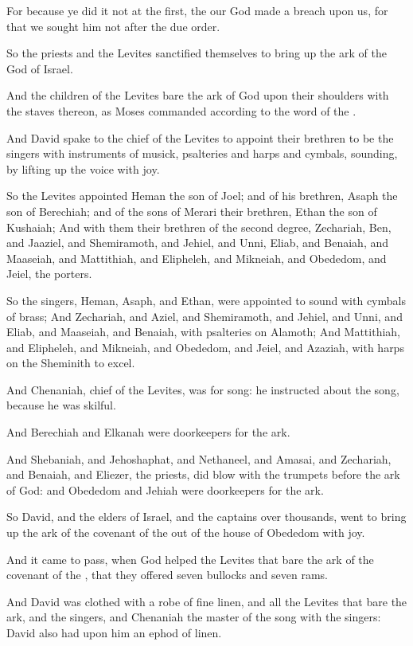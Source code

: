\Verse For because ye did it not at the first, the \LORD our God made a breach upon us, for that we sought him not after the due order.

\Verse So the priests and the Levites sanctified themselves to bring up the ark of the \LORD God of Israel.

\Verse And the children of the Levites bare the ark of God upon their shoulders with the staves thereon, as Moses commanded according to the word of the \LORD.

\Verse And David spake to the chief of the Levites to appoint their brethren to be the singers with instruments of musick, psalteries and harps and cymbals, sounding, by lifting up the voice with joy.

\Verse So the Levites appointed Heman the son of Joel; and of his brethren, Asaph the son of Berechiah; and of the sons of Merari their brethren, Ethan the son of Kushaiah; \Verse And with them their brethren of the second degree, Zechariah, Ben, and Jaaziel, and Shemiramoth, and Jehiel, and Unni, Eliab, and Benaiah, and Maaseiah, and Mattithiah, and Elipheleh, and Mikneiah, and Obededom, and Jeiel, the porters.

\Verse So the singers, Heman, Asaph, and Ethan, were appointed to sound with cymbals of brass; \Verse And Zechariah, and Aziel, and Shemiramoth, and Jehiel, and Unni, and Eliab, and Maaseiah, and Benaiah, with psalteries on Alamoth; \Verse And Mattithiah, and Elipheleh, and Mikneiah, and Obededom, and Jeiel, and Azaziah, with harps on the Sheminith to excel.

\Verse And Chenaniah, chief of the Levites, was for song: he instructed about the song, because he was skilful.

\Verse And Berechiah and Elkanah were doorkeepers for the ark.

\Verse And Shebaniah, and Jehoshaphat, and Nethaneel, and Amasai, and Zechariah, and Benaiah, and Eliezer, the priests, did blow with the trumpets before the ark of God: and Obededom and Jehiah were doorkeepers for the ark.

\Verse So David, and the elders of Israel, and the captains over thousands, went to bring up the ark of the covenant of the \LORD out of the house of Obededom with joy.

\Verse And it came to pass, when God helped the Levites that bare the ark of the covenant of the \LORD, that they offered seven bullocks and seven rams.

\Verse And David was clothed with a robe of fine linen, and all the Levites that bare the ark, and the singers, and Chenaniah the master of the song with the singers: David also had upon him an ephod of linen.

